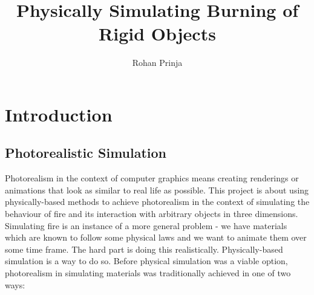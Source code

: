 \documentclass[a4paper]{report}
\author{
  Rohan Prinja
}
\title{Physically Simulating Burning of Rigid Objects}
\begin{document}
\maketitle

\tableofcontents

\chapter{Introduction}

\section{Photorealistic Simulation} %
\label{sec:photorealistic_simulation}

Photorealism in the context of computer graphics means creating renderings or animations that look as similar to real life as possible. This project is about using physically-based methods to achieve photorealism in the context of simulating the behaviour of fire and its interaction with arbitrary objects in three dimensions. Simulating fire is an instance of a more general problem - we have materials which are known to follow some physical laws and we want to animate them over some time frame. The hard part is doing this realistically. Physically-based simulation is a way to do so. Before physical simulation was a viable option, photorealism in simulating materials was traditionally achieved in one of two ways:
\end{document}
